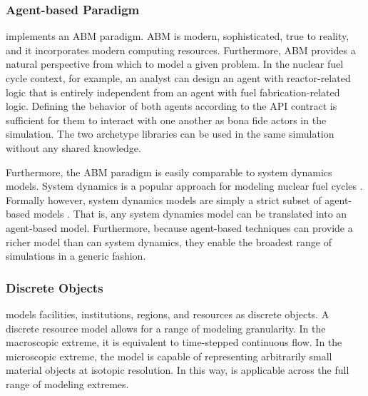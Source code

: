 \subsubsection{Agent-based Paradigm}

\Cyclus implements an \gls{ABM} paradigm.  \gls{ABM} is modern, sophisticated, 
true to reality, and it incorporates modern computing resources.  
Furthermore, \gls{ABM} provides a natural 
perspective from which to model a given problem. In the nuclear fuel cycle 
context, for example, an analyst can design an agent with reactor-related logic 
that is entirely independent from an agent with fuel fabrication-related 
logic. Defining the behavior of both agents according to the 
\gls{API} contract is sufficient for them to interact with one another as 
bona fide actors in the simulation.  The two archetype libraries can be used in the same
simulation without any shared knowledge.

Furthermore, the \gls{ABM} paradigm is easily comparable to system dynamics models.
System dynamics is a popular approach for modeling nuclear fuel cycles 
\cite{jacobson_vision_2009,van_den_durpel_daness_2009,guerin_impact_2009,guerin_benchmark_2009}. 
Formally however, system dynamics models are simply a strict subset of agent-based models
\cite{macal_agent-based_2010}.
That is, any system dynamics model can be translated
into an agent-based model. Furthermore, because agent-based
techniques can provide a richer model than can system dynamics, they enable the 
broadest range of simulations in a generic fashion.

\subsubsection{Discrete Objects}

\Cyclus models facilities, institutions, regions, and resources as discrete 
objects. A discrete resource model allows for a range of modeling granularity. In the
macroscopic extreme, it is equivalent to time-stepped continuous flow. In the
microscopic extreme, the model is capable of representing arbitrarily small 
material objects at isotopic resolution. In this way, \Cyclus is 
applicable across the full range of modeling extremes. 

